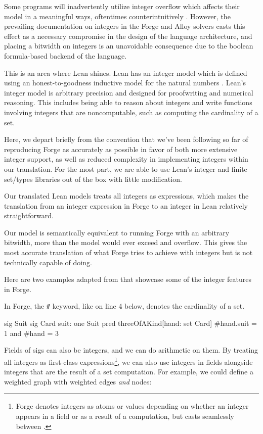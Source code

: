 Some programs will inadvertently utilize integer overflow which affects their model in a meaningful ways, oftentimes counterintuitively \cite[22]{ngpdbccdlrrvwwk-oopsla-2024}. However, the prevailing documentation on integers in the Forge and Alloy solvers casts this effect as a necessary compromise in the design of the language architecture, and placing a bitwidth on integers is an unavoidable consequence due to the boolean formula-based backend of the language. 

This is an area where Lean shines. Lean has an integer model which is defined using an honest-to-goodness inductive model for the natural numbers \cite{avigad2024theorem}. Lean's integer model is arbitrary precision and designed for proofwriting and numerical reasoning. This includes being able to reason about integers and write functions involving integers that are noncomputable, such as computing the cardinality of a set. 

Here, we depart briefly from the convention that we've been following so far of reproducing Forge as accurately as possible in favor of both more extensive integer support, as well as reduced complexity in implementing integers within our translation. For the most part, we are able to use Lean's integer and finite set/types libraries out of the box with little modification. 

Our translated Lean models treats all integers as expressions, which makes the translation from an integer expression in Forge to an integer in Lean relatively straightforward. 

Our model is semantically equivalent to running Forge with an arbitrary bitwidth, more than the model would ever exceed and overflow. This gives the most accurate translation of what Forge tries to achieve with integers but is not technically capable of doing. 

Here are two examples adapted from \cite{jackson2012software} that showcase some of the integer features in Forge. 

In Forge, the \texttt{\#} keyword, like on line 4 below, denotes the cardinality of a set. 

\begin{forge}
sig Suit {}
sig Card { suit: one Suit }
pred threeOfAKind[hand: set Card] {
  #hand.suit = 1 and #hand = 3
}
\end{forge}

Fields of sigs can also be integers, and we can do arithmetic on them. By treating all integers as first-class expressions\footnote{Forge denotes integers as atoms or values depending on whether an integer appears in a field or as a result of a computation, but casts seamlessly between \cite{forge-docs,nelson2024artifact}.}, we can also use integers in fields alongside integers that are the result of a set computation. For example, we could define a weighted graph with weighted edges \emph{and} nodes:

